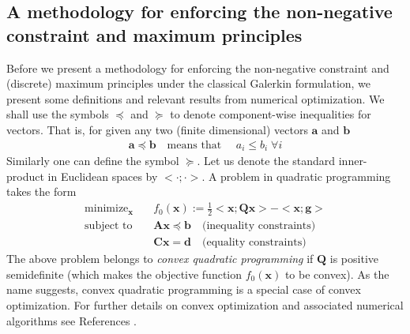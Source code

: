 \documentclass[11pt]{amsart}
\begin{document}
\subsection{A methodology for enforcing the non-negative constraint and maximum principles}
Before we present a methodology for enforcing the non-negative constraint and (discrete) maximum 
principles under the classical Galerkin formulation, we present some definitions and relevant 
results from numerical optimization. We shall use the symbols $\preceq$ and $\succeq$ to denote 
component-wise inequalities for vectors. That is, for given any two (finite dimensional) vectors 
$\boldsymbol{a}$ and $\boldsymbol{b}$ 
\begin{align}
  \boldsymbol{a} \preceq \boldsymbol{b} \quad 
  \mbox{means that } \quad a_i \leq b_i \; \forall i
\end{align}
Similarly one can define the symbol $\succeq$. Let us denote the standard inner-product in 
Euclidean spaces by $<\cdot;\cdot>$. A problem in quadratic programming takes the form
\begin{subequations}
  \label{Eqn:Decay_QP}
  \begin{align}
    \mathop{\mbox{minimize}}_{\boldsymbol{x}}  & \quad f_0(\boldsymbol{x}) := \frac{1}{2} 
    <\boldsymbol{x}; \boldsymbol{Q} \boldsymbol{x}> - <\boldsymbol{x}; \boldsymbol{g}> \\
\label{Eqn:Decay_QP_standard_inequality}
    \mbox{subject to} & \quad \boldsymbol{A} \boldsymbol{x} \preceq \boldsymbol{b} 
    \quad \mbox{(inequality constraints)} \\
& \quad \boldsymbol{C} \boldsymbol{x} = \boldsymbol{d} \quad \mbox{(equality constraints)}
  \end{align}
\end{subequations}
The above problem belongs to \emph{convex quadratic programming} if $\boldsymbol{Q}$ 
is positive semidefinite (which makes the objective function $f_0(\boldsymbol{x})$ 
to be convex). As the name suggests, convex quadratic programming is a special case 
of convex optimization. For further details on convex optimization and associated 
numerical algorithms see References \cite{Boyd_convex_optimization,Nocedal_Wright,
Luenberger_Ye_Nonlinear_Programming}. 
\end{document}
